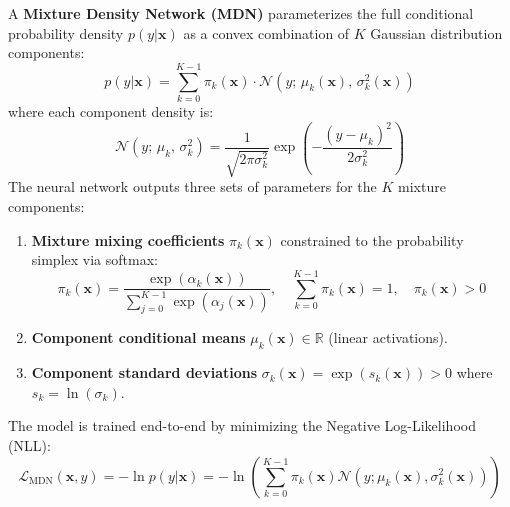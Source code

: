\documentclass[11pt,a4paper]{article}
\theoremstyle{definition}
\begin{document}
A \textbf{Mixture Density Network (MDN)} parameterizes the full conditional probability density $p(y | \mathbf{x})$ as a convex combination of $K$ Gaussian distribution components:
{\boldmath
\begin{equation}
p(y | \mathbf{x}) = \sum_{k=0}^{K-1} \pi_k(\mathbf{x}) \cdot \mathcal{N}\left( y; \, \mu_k(\mathbf{x}), \, \sigma_k^2(\mathbf{x}) \right)
\end{equation}
}
where each component density is:
{\boldmath
\begin{equation}
\mathcal{N}\left( y; \, \mu_k, \, \sigma_k^2 \right) = \frac{1}{\sqrt{2\pi \sigma_k^2}} \exp\left( - \frac{(y - \mu_k)^2}{2\sigma_k^2} \right)
\end{equation}
}
The neural network outputs three sets of parameters for the $K$ mixture components:
\begin{enumerate}
    \item \textbf{Mixture mixing coefficients} $\pi_k(\mathbf{x})$ constrained to the probability simplex via softmax:
    {\boldmath
    \begin{equation}
    \pi_k(\mathbf{x}) = \frac{\exp(\alpha_k(\mathbf{x}))}{\sum_{j=0}^{K-1} \exp(\alpha_j(\mathbf{x}))}, \quad \sum_{k=0}^{K-1} \pi_k(\mathbf{x}) = 1, \quad \pi_k(\mathbf{x}) > 0
    \end{equation}
    }
    \item \textbf{Component conditional means} $\mu_k(\mathbf{x}) \in \mathbb{R}$ (linear activations).
    \item \textbf{Component standard deviations} $\sigma_k(\mathbf{x}) = \exp(s_k(\mathbf{x})) > 0$ where $s_k = \ln(\sigma_k)$.
\end{enumerate}
The model is trained end-to-end by minimizing the Negative Log-Likelihood (NLL):
{\boldmath
\begin{equation}
\mathcal{L}_{\text{MDN}}(\mathbf{x}, y) = - \ln p(y | \mathbf{x}) = - \ln \left( \sum_{k=0}^{K-1} \pi_k(\mathbf{x}) \mathcal{N}(y; \mu_k(\mathbf{x}), \sigma_k^2(\mathbf{x})) \right)
\end{equation}
}
\end{document}
